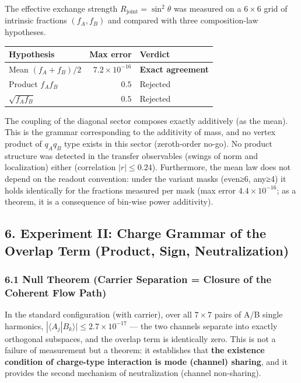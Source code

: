\documentclass[
  a4paper,
]{article}
\newcounter{none} %
\begin{document}
The effective exchange strength \(R_{\mathrm{joint}}=\sin^2\theta\) was
measured on a \(6\times6\) grid of intrinsic fractions \((f_A,f_B)\) and
compared with three composition-law hypotheses.

{\def\LTcaptype{none} %
\begin{longtable}[]{@{}lrl@{}}
\toprule\noalign{}
Hypothesis & Max error & Verdict \\
\midrule\noalign{}
\endhead
\bottomrule\noalign{}
\endlastfoot
Mean \((f_A+f_B)/2\) & \(7.2\times10^{-16}\) & \textbf{Exact
agreement} \\
Product \(f_Af_B\) & \(0.5\) & Rejected \\
\(\sqrt{f_Af_B}\) & \(0.5\) & Rejected \\
\end{longtable}
}

The coupling of the diagonal sector composes exactly additively (as the
mean). This is the grammar corresponding to the additivity of mass, and
no vertex product of \(q_Aq_B\) type exists in this sector (zeroth-order
no-go). No product structure was detected in the transfer observables
(swings of norm and localization) either (correlation \(|r|\le0.24\)).
Furthermore, the mean law does not depend on the readout convention:
under the variant masks (even≥6, any≥4) it holds identically for the
fractions measured per mask (max error \(4.4\times10^{-16}\); as a
theorem, it is a consequence of bin-wise power additivity).

\subsection{6. Experiment II: Charge Grammar of the Overlap Term
(Product, Sign,
Neutralization)}\label{experiment-ii-charge-grammar-of-the-overlap-term-product-sign-neutralization}

\subsubsection{6.1 Null Theorem (Carrier Separation = Closure of the
Coherent Flow
Path)}\label{null-theorem-carrier-separation-closure-of-the-coherent-flow-path}

In the standard configuration (with carrier), over all \(7\times7\)
pairs of A/B single harmonics,
\(|\langle A_j|B_k\rangle|\le2.7\times10^{-17}\) --- the two channels
separate into exactly orthogonal subspaces, and the overlap term is
identically zero. This is not a failure of measurement but a theorem: it
establishes that \textbf{the existence condition of charge-type
interaction is mode (channel) sharing}, and it provides the second
mechanism of neutralization (channel non-sharing).
\end{document}
